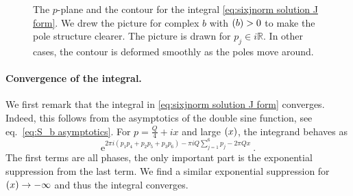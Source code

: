 \documentclass[12pt,a4paper]{article}
\newcommand{\be}{\begin{equation}}
\newcommand{\ee}{\end{equation}}
\newcommand\RR{\mathbb{R}}
\let\Re\relax
\DeclareMathOperator\Re{Re}
\begin{document}
\begin{figure}[ht]
    \caption{The $p$-plane and the contour for the integral \eqref{eq:sixjnorm solution J form}. We drew the picture for complex $b$ with $\Re(b)>0$ to make the pole structure clearer. The picture is drawn for $p_j \in i \RR$. In other cases, the contour is deformed smoothly as the poles move around.}
    \label{fig:p plane J}
\end{figure}

\paragraph{Convergence of the integral.} We first remark that the integral in \eqref{eq:sixjnorm solution J form} converges. Indeed, this follows from the asymptotics of the double sine function, see eq.~\eqref{eq:S_b asymptotics}. For $p=\frac{Q}{4}+i x$ and large $\Re(x)$, the integrand behaves as
\be 
\mathrm{e}^{2\pi i (p_1p_4+p_2p_5+p_3p_6)-\pi i Q\sum_{j=1}^6 p_j-2\pi Q x}\ .
\ee
The first terms are all phases, the only important part is the exponential suppression from the last term. We find a similar exponential suppression for $\Re (x) \to -\infty$ and thus the integral converges.
\end{document}
